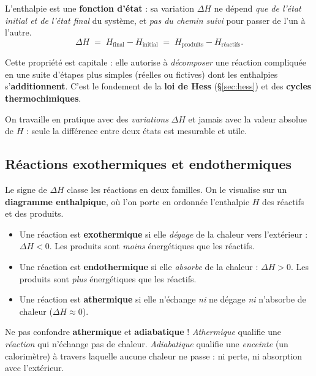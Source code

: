 \documentclass[11pt,a4paper]{article}
\newcommand{\dH}{\Delta H}
\begin{document}
\begin{theoreme}
L'enthalpie est une \textbf{fonction d'état} : sa variation $\dH$ ne dépend \emph{que de l'état initial
et de l'état final} du système, et \emph{pas du chemin suivi} pour passer de l'un à l'autre.
\[ \dH \;=\; H_{\text{final}} - H_{\text{initial}} \;=\; H_{\text{produits}} - H_{\text{réactifs}}. \]
\end{theoreme}

Cette propriété est capitale : elle autorise à \emph{décomposer} une réaction compliquée en une suite
d'étapes plus simples (réelles ou fictives) dont les enthalpies s'\textbf{additionnent}. C'est le
fondement de la \textbf{loi de Hess} (§\ref{sec:hess}) et des \textbf{cycles thermochimiques}.

\begin{remarque}
On travaille en pratique avec des \emph{variations} $\dH$ et jamais avec la valeur absolue de $H$ :
seule la différence entre deux états est mesurable et utile.
\end{remarque}

\subsection{Réactions exothermiques et endothermiques}

Le signe de $\dH$ classe les réactions en deux familles. On le visualise sur un \textbf{diagramme
enthalpique}, où l'on porte en ordonnée l'enthalpie $H$ des réactifs et des produits.

\begin{definition}
\begin{itemize}[leftmargin=1.6em,topsep=2pt,itemsep=2pt]
  \item Une réaction est \textbf{exothermique} si elle \emph{dégage} de la chaleur vers l'extérieur :
        $\dH < 0$. Les produits sont \emph{moins} énergétiques que les réactifs.
  \item Une réaction est \textbf{endothermique} si elle \emph{absorbe} de la chaleur : $\dH > 0$. Les
        produits sont \emph{plus} énergétiques que les réactifs.
  \item Une réaction est \textbf{athermique} si elle n'échange \emph{ni} ne dégage \emph{ni} n'absorbe
        de chaleur ($\dH \approx 0$).
\end{itemize}
\end{definition}

\begin{attention}
Ne pas confondre \textbf{athermique} et \textbf{adiabatique} ! \emph{Athermique} qualifie une
\emph{réaction} qui n'échange pas de chaleur. \emph{Adiabatique} qualifie une \emph{enceinte} (un
calorimètre) à travers laquelle aucune chaleur ne passe : ni perte, ni absorption avec l'extérieur.
\end{attention}
\end{document}
